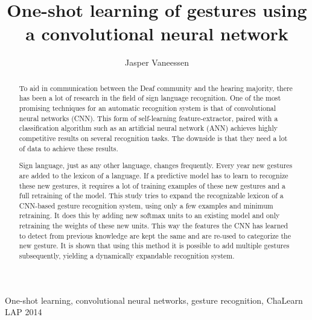 \documentclass[twocolumn]{phdsymp} %
\begin{document}
\title{One-shot learning of gestures using a convolutional neural network} %

\author{Jasper Vaneessen}



\maketitle

\begin{abstract}
To aid in communication between the Deaf community and the hearing majority, there has been a lot of research in the field of sign language recognition. One of the most promising techniques for an automatic recognition system is that of convolutional neural networks (CNN). This form of self-learning feature-extractor, paired with a classification algorithm such as an artificial neural network (ANN) achieves highly competitive results on several recognition tasks. The downside is that they need a lot of data to achieve these results.

Sign language, just as any other language, changes frequently. Every year new gestures are added to the lexicon of a language. If a predictive model has to learn to recognize these new gestures, it requires a lot of training examples of these new gestures and a full retraining of the model. This study tries to expand the recognizable lexicon of a CNN-based gesture recognition system, using only a few examples and minimum retraining. It does this by adding new softmax units to an existing model and only retraining the weights of these new units. This way the features the CNN has learned to detect from previous knowledge are kept the same and are re-used to categorize the new gesture. It is shown that using this method it is possible to add multiple gestures subsequently, yielding a dynamically expandable recognition system.
\end{abstract}

\begin{keywords}
One-shot learning, convolutional neural networks, gesture recognition, ChaLearn LAP 2014
\end{keywords}
\end{document}
